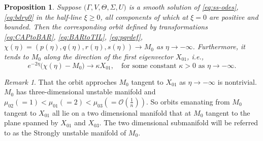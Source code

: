 \documentclass[a4paper,11pt]{article}
\def\BO{{\mathcal{O}}}
\newtheorem{proposition}{Proposition}[section]
\theoremstyle{remark}
\newtheorem{remark}{Remark}[section]
\begin{document}
\begin{proposition} \label{prop1}
    Suppose $\big(\Gamma,V,\Theta,\Sigma,U\big)$ is a smooth solution of \eqref{eq:ss-odes}, \eqref{eq:bdry0} in the half-line $\xi\ge0$, all components of which at $\xi=0$ are positive and bounded. Then the corresponding orbit defined by transformations \eqref{eq:CAPtoBAR}, \eqref{eq:BARtoTIL}, \eqref{eq:pqrdef}, $\chi(\eta) = (p(\eta), q(\eta), r(\eta),s(\eta)) \rightarrow M_0$ as $\eta \rightarrow -\infty$. Furthermore, it tends to $M_0$ along the direction of the first eigenvector $X_{01}$, i.e.,
    \begin{equation} \label{eq:alpha}
     e^{-2\eta}\big(\chi(\eta) - M_0 \big) \rightarrow \kappa X_{01}, \quad \text{for some constant $\kappa>0$ as $\eta \rightarrow -\infty$.}
    \end{equation}
\end{proposition}

\begin{remark} \label{rem:alpha}
  That the orbit approches $M_0$ tangent to $X_{01}$ as $\eta \rightarrow -\infty$ is nontrivial. $M_0$ has three-dimensional unstable manifold and $\mu_{02}(=1)<\mu_{01}(=2)<\mu_{03}(=\BO(\frac{1}{n}))$. %
  So orbits emanating from $M_0$ tangent to $X_{01}$ all lie on a two dimensional manifold that at $M_0$ tangent to the plane spanned by $X_{01}$ and $X_{03}$. The two dimensional submanifold will be referred to as the Strongly unstable manifold of $M_0$.
\end{remark}
\end{document}
